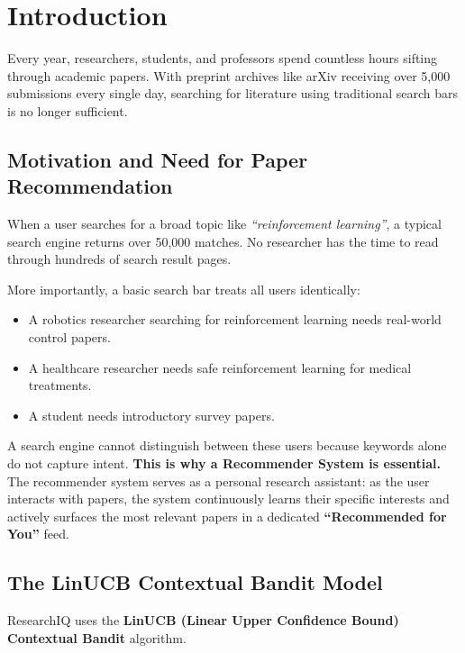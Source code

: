 \documentclass[11pt,a4paper]{article}
\begin{document}
\newpage
{
\tableofcontents
}
\newpage

\section{Introduction}

Every year, researchers, students, and professors spend countless hours sifting through academic papers. With preprint archives like arXiv receiving over 5,000 submissions every single day, searching for literature using traditional search bars is no longer sufficient.

\subsection{Motivation and Need for Paper Recommendation}
When a user searches for a broad topic like \textit{``reinforcement learning''}, a typical search engine returns over 50,000 matches. No researcher has the time to read through hundreds of search result pages. 

More importantly, a basic search bar treats all users identically:
\begin{itemize}[leftmargin=1.5em]
    \item A robotics researcher searching for reinforcement learning needs real-world control papers.
    \item A healthcare researcher needs safe reinforcement learning for medical treatments.
    \item A student needs introductory survey papers.
\end{itemize}

A search engine cannot distinguish between these users because keywords alone do not capture intent. \textbf{This is why a Recommender System is essential.} The recommender system serves as a personal research assistant: as the user interacts with papers, the system continuously learns their specific interests and actively surfaces the most relevant papers in a dedicated \textbf{``Recommended for You''} feed.

\subsection{The LinUCB Contextual Bandit Model}
ResearchIQ uses the \textbf{LinUCB (Linear Upper Confidence Bound) Contextual Bandit} algorithm. 
\end{document}
